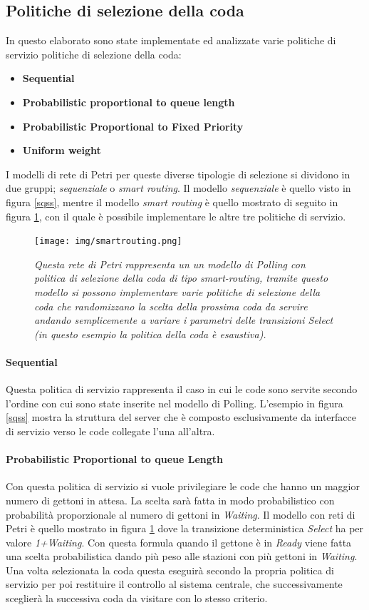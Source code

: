\documentclass[12pt,a4paper,italian]{article}
\begin{document}
\subsection{Politiche di selezione della coda}
In questo elaborato sono state implementate ed analizzate varie politiche di servizio politiche di selezione della coda:
\begin{itemize}
	\item \textbf{Sequential} 
	\item \textbf{Probabilistic proportional to queue length} 
	\item \textbf{Probabilistic Proportional to Fixed Priority} 
	\item \textbf{Uniform weight} 
\end{itemize}
I modelli di rete di Petri per queste diverse tipologie di selezione si dividono in due gruppi; \emph{sequenziale} o \emph{smart routing}. Il modello \emph{sequenziale} è quello visto in figura \ref{sqss}, mentre il modello \emph{smart routing} è quello mostrato di seguito in figura \ref{smartrouting}, con il quale è possibile implementare le altre tre politiche di servizio.
\begin{figure}[!h]
	\centering
	\texttt{[image: img/smartrouting.png]}
	\caption{\emph{Questa rete di Petri rappresenta un un modello di Polling con politica di selezione della coda di tipo smart-routing, tramite questo modello si possono implementare varie politiche di selezione della coda che randomizzano la scelta della prossima coda da servire andando semplicemente a variare i parametri delle transizioni Select (in questo esempio la politica della coda è esaustiva).}}
	\label{smartrouting}
\end{figure}
\paragraph{Sequential}
Questa politica di servizio rappresenta il caso in cui le code sono servite secondo l'ordine con cui sono state inserite nel modello di Polling. L'esempio in figura \ref{sqss} mostra la struttura del server che è composto esclusivamente da interfacce di servizio verso le code collegate l'una all'altra.

\paragraph{Probabilistic Proportional to queue Length} Con questa politica di servizio si vuole privilegiare le code che hanno un maggior numero di gettoni in attesa. La scelta sarà fatta in modo probabilistico con probabilità proporzionale al numero di gettoni in \emph{Waiting}. Il modello con reti di Petri è quello mostrato in figura \ref{smartrouting} dove la  transizione deterministica \emph{Select} ha per valore \emph{1+Waiting}. Con questa formula quando il gettone è in \emph{Ready} viene fatta una scelta probabilistica dando più peso alle stazioni con più gettoni in \emph{Waiting}. Una volta selezionata la coda questa eseguirà secondo la propria politica di servizio per poi restituire il controllo al sistema centrale, che successivamente sceglierà la successiva coda da visitare con lo stesso criterio.
\end{document}
